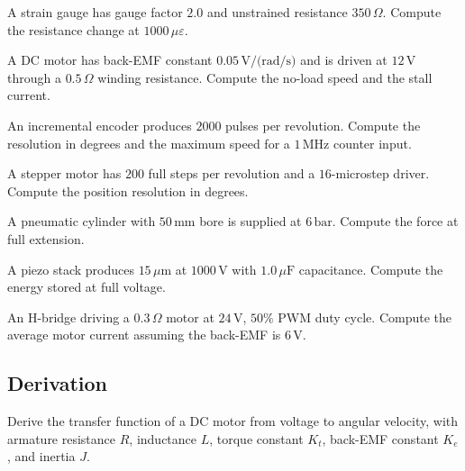 \begin{exercise}
A strain gauge has gauge factor $2.0$ and unstrained resistance $350\,\Omega$. Compute the resistance change at $1000\,\mu\varepsilon$.
\end{exercise}

\begin{exercise}
A DC motor has back-EMF constant $0.05\,\text{V/(rad/s)}$ and is driven at $12\,\text{V}$ through a $0.5\,\Omega$ winding resistance. Compute the no-load speed and the stall current.
\end{exercise}

\begin{exercise}
An incremental encoder produces $2000$ pulses per revolution. Compute the resolution in degrees and the maximum speed for a $1\,\text{MHz}$ counter input.
\end{exercise}

\begin{exercise}
A stepper motor has $200$ full steps per revolution and a $16$-microstep driver. Compute the position resolution in degrees.
\end{exercise}

\begin{exercise}
A pneumatic cylinder with $50\,\text{mm}$ bore is supplied at $6\,\text{bar}$. Compute the force at full extension.
\end{exercise}

\begin{exercise}
A piezo stack produces $15\,\mu\text{m}$ at $1000\,\text{V}$ with $1.0\,\mu\text{F}$ capacitance. Compute the energy stored at full voltage.
\end{exercise}

\begin{exercise}
An H-bridge driving a $0.3\,\Omega$ motor at $24\,\text{V}$, $50\%$ PWM duty cycle. Compute the average motor current assuming the back-EMF is $6\,\text{V}$.
\end{exercise}

\subsection*{Derivation}

\begin{exercise}
Derive the transfer function of a DC motor from voltage to angular velocity, with armature resistance $R$, inductance $L$, torque constant $K_t$, back-EMF constant $K_e$, and inertia $J$.
\end{exercise}

